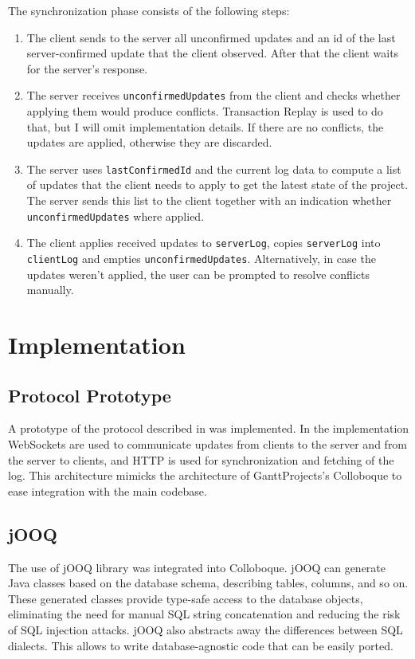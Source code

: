 \documentclass[a4paper, 11pt, oneside]{article}
\theoremstyle{definition}
\begin{document}
The synchronization phase consists of the following steps:

\begin{enumerate}
    \item The client sends to the server all unconfirmed updates and an id of the last server-confirmed update that the client observed. After that the client waits for the server's response.
    \item The server receives \verb|unconfirmedUpdates| from the client and checks whether applying them would produce conflicts. Transaction Replay is used to do that, but I will omit implementation details. If there are no conflicts, the updates are applied, otherwise they are discarded.
    \item The server uses \verb|lastConfirmedId| and the current log data to compute a list of updates that the client needs to apply to get the latest state of the project. The server sends this list to the client together with an indication whether \verb|unconfirmedUpdates| where applied.
    \item The client applies received updates to \verb|serverLog|, copies \verb|serverLog| into \verb|clientLog| and empties \verb|unconfirmedUpdates|. Alternatively, in case the updates weren't applied, the user can be prompted to resolve conflicts manually.
\end{enumerate}

\section{Implementation}

\subsection*{Protocol Prototype}

A prototype of the protocol described in  was implemented\cite{prototype}. In the implementation WebSockets are used to communicate updates from clients to the server and from the server to clients, and HTTP is used for synchronization and fetching of the log. This architecture mimicks the architecture of GanttProjects's Colloboque to ease integration with the main codebase.

\subsection*{jOOQ}

The use of jOOQ library \cite{jooq} was integrated into Colloboque. jOOQ can generate Java classes based on the database schema, describing tables, columns, and so on. These generated classes provide type-safe access to the database objects, eliminating the need for manual SQL string concatenation and reducing the risk of SQL injection attacks. jOOQ also abstracts away the differences between SQL dialects. This allows to write database-agnostic code that can be easily ported.
\end{document}
